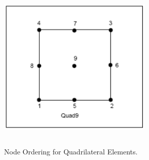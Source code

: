 \begin{figure}
\begin{center}
{\includegraphics[width=2.9in, height=2.9in]{topology/quad9.png}}
\caption{Node Ordering for Quadrilateral Elements.}\label{topology:quad}
\end{center}
\end{figure}

